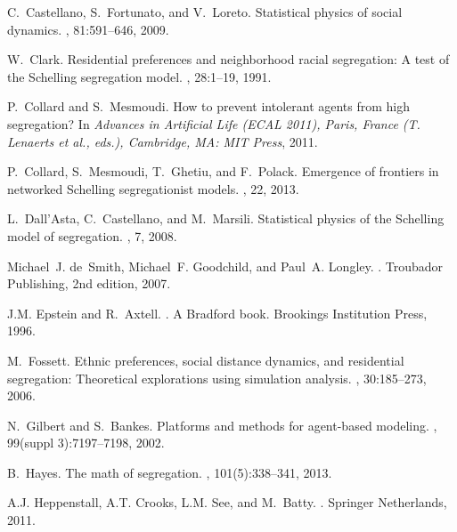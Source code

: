 \documentclass[11pt]{article}
\theoremstyle{plain}
\numberwithin{equation}{subsection}
\begin{document}
\begin{thebibliography}{CMGP13}
C.~Castellano, S.~Fortunato, and V.~Loreto.
\newblock Statistical physics of social dynamics.
, 81:591--646, 2009.

W.\ Clark.
\newblock Residential preferences and neighborhood racial segregation: A test
  of the {S}chelling segregation model.
, 28:1--19, 1991.

P.~Collard and S.~Mesmoudi.
\newblock How to prevent intolerant agents from high segregation?
\newblock In {\em Advances in Artificial Life (ECAL 2011), Paris, France (T.
  Lenaerts et al., eds.), Cambridge, MA: MIT Press}, 2011.

P.~Collard, S.~Mesmoudi, T.~Ghetiu, and F.~Polack.
\newblock Emergence of frontiers in networked {S}chelling segregationist
  models.
, 22, 2013.

L.~Dall'Asta, C.~Castellano, and M.~Marsili.
\newblock Statistical physics of the {S}chelling model of segregation.
, 7,
  2008.

Michael~J. de~Smith, Michael~F. Goodchild, and Paul~A. Longley.
.
\newblock Troubador Publishing, 2nd edition, 2007.

J.M. Epstein and R.~Axtell.
.
\newblock A Bradford book. Brookings Institution Press, 1996.

M.~Fossett.
\newblock Ethnic preferences, social distance dynamics, and residential
  segregation: Theoretical explorations using simulation analysis.
, 30:185--273, 2006.

N.~Gilbert and S.~Bankes.
\newblock Platforms and methods for agent-based modeling.
, 99(suppl
  3):7197--7198, 2002.

B.~Hayes.
\newblock The math of segregation.
, 101(5):338--341, 2013.

A.J. Heppenstall, A.T. Crooks, L.M. See, and M.~Batty.
.
\newblock Springer Netherlands, 2011.


\end{thebibliography}
\end{document}
